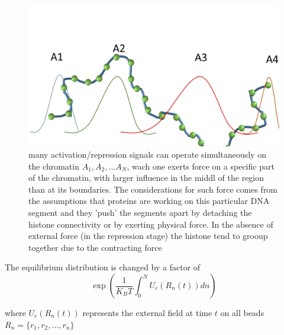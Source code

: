 \documentclass[12pt]{paper}
\begin{document}
\begin{figure}[h~]
\includegraphics[scale=0.4]{forceInfluenceOnChain}
\caption{many activation/repression signals can operate simultaneously on the chromatin $A_1,A_2,...A_N$, wach one exerts force on a specific part of the chromatin, with larger influence in the middl of the region than at its boundaries. The considerations for such force comes from the assumptions that proteins are working on this particular DNA segment and they 'push' the segments apart by detaching the histone connectivity or by exerting physical force. In the absence of external force (in the repression stage) the histone tend to grooup together due to the contracting force}
\label{foce influence on the chromatin dynamics}
\end{figure}

The equilibrium distribution is changed by a factor of 
\begin{equation}
\exp\left(\frac{1}{K_BT}\int_{0}^NU_e(R_n(t))dn\right)
\end{equation}

where $U_e(R_n(t))$ represents the external field at time $t$ on all beads $R_n=\{r_1,r_2,...,r_n\}$
\end{document}
